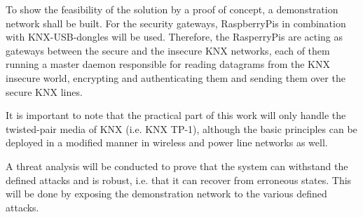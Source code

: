 \documentclass[a4paper,11pt,oneside]{memoir}
\begin{document}
To show the feasibility of the solution by a proof of concept, a demonstration network  shall be built.
For the security gateways, RaspberryPis in combination with KNX-USB-dongles will be used. Therefore, the RasperryPis
are acting as gateways between the secure and the insecure KNX networks, each of them running a master daemon responsible
for reading datagrams from the KNX insecure world, encrypting and authenticating them and sending them over the secure
KNX lines.





It is important to note that the practical part of this work will only
handle the twisted-pair media of KNX (i.e. KNX TP-1), although the basic principles can be deployed in a modified manner in
wireless and power line networks as well.

A threat analysis will be conducted to prove that the system can withstand the defined attacks and is robust,
i.e. that it can recover from erroneous states. This will be done by exposing the demonstration network to the various defined attacks.  
\end{document}
